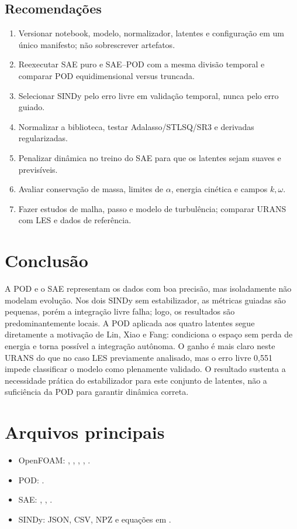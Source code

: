 \documentclass[12pt,a4paper]{article}
\begin{document}
\subsection*{Recomendações}
\begin{enumerate}
\item Versionar notebook, modelo, normalizador, latentes e configuração em um único manifesto; não sobrescrever artefatos.
\item Reexecutar SAE puro e SAE--POD com a mesma divisão temporal e comparar POD equidimensional versus truncada.
\item Selecionar SINDy pelo erro livre em validação temporal, nunca pelo erro guiado.
\item Normalizar a biblioteca, testar Adalasso/STLSQ/SR3 e derivadas regularizadas.
\item Penalizar dinâmica no treino do SAE para que os latentes sejam suaves e previsíveis.
\item Avaliar conservação de massa, limites de $\alpha$, energia cinética e campos $k,\omega$.
\item Fazer estudos de malha, passo e modelo de turbulência; comparar URANS com LES e dados de referência.
\end{enumerate}

\section{Conclusão}
A POD e o SAE representam os dados com boa precisão, mas isoladamente não modelam evolução. Nos dois SINDy sem estabilizador, as métricas guiadas são pequenas, porém a integração livre falha; logo, os resultados são predominantemente locais. A POD aplicada aos quatro latentes segue diretamente a motivação de Lin, Xiao e Fang: condiciona o espaço sem perda de energia e torna possível a integração autônoma. O ganho é mais claro neste URANS do que no caso LES previamente analisado, mas o erro livre 0,551 impede classificar o modelo como plenamente validado. O resultado sustenta a necessidade prática do estabilizador para este conjunto de latentes, não a suficiência da POD para garantir dinâmica correta.

\appendix
\section{Arquivos principais}
\small
\begin{itemize}
\item OpenFOAM: , , , , .
\item POD: .
\item SAE: , , .
\item SINDy: JSON, CSV, NPZ e equações em .
\end{itemize}\normalsize
\end{document}
